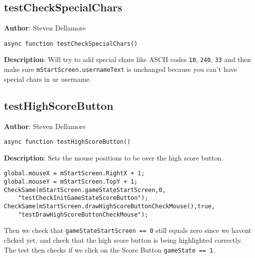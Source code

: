 \documentclass[12pt]{article}
\begin{document}
\subsection{testCheckSpecialChars}
\textbf{Author}: Steven Dellamore 
\vspace*{1\baselineskip}
\begin{lstlisting}
async function testCheckSpecialChars()
\end{lstlisting} 
\vspace*{1\baselineskip}
\textbf{Description}: Will try to add special chars like ASCII codes \texttt{10}, \texttt{240}, \texttt{33} and then make sure \texttt{mStartScreen.usernameText} is unchanged because you can't have special chars in ur username. 



\subsection{testHighScoreButton}
\textbf{Author}: Steven Dellamore 
\vspace*{1\baselineskip}
\begin{lstlisting}
async function testHighScoreButton()
\end{lstlisting} 
\vspace*{1\baselineskip}
\textbf{Description}: Sets the mouse positions to be over the high score button. 
\begin{verbatim}
global.mouseX = mStartScreen.RightX + 1;
global.mouseY = mStartScreen.TopY + 1;
CheckSame(mStartScreen.gameStateStartScreen,0,
    "testCheckInitGameStateScoreButton");
CheckSame(mStartScreen.drawHighScoreButtonCheckMouse(),true,
    "testDrawHighScoreButtonCheckMouse");
\end{verbatim}
 Then we check that \texttt{gameStateStartScreen == 0} still equals zero since we havent clicked yet, and check that the high score button is being highlighted correctly. The test then checks if we click on the Score Button \texttt{gameState == 1}. 
\end{document}
